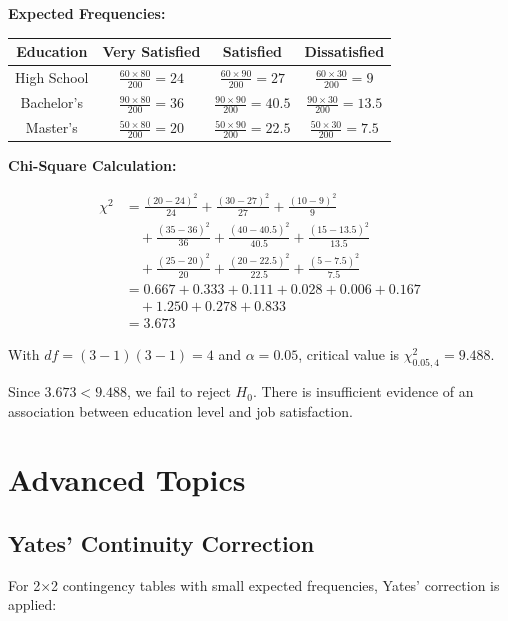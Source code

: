 \documentclass[twoside]{book}
\begin{document}
\textbf{Expected Frequencies:}

\begin{center}
\begin{tabular}{|c|c|c|c|}
\hline
Education & Very Satisfied & Satisfied & Dissatisfied \\
\hline
High School & $\frac{60 \times 80}{200} = 24$ & $\frac{60 \times 90}{200} = 27$ & $\frac{60 \times 30}{200} = 9$ \\
Bachelor's & $\frac{90 \times 80}{200} = 36$ & $\frac{90 \times 90}{200} = 40.5$ & $\frac{90 \times 30}{200} = 13.5$ \\
Master's & $\frac{50 \times 80}{200} = 20$ & $\frac{50 \times 90}{200} = 22.5$ & $\frac{50 \times 30}{200} = 7.5$ \\
\hline
\end{tabular}
\end{center}

\textbf{Chi-Square Calculation:}

\begin{align}
\chi^2 &= \frac{(20-24)^2}{24} + \frac{(30-27)^2}{27} + \frac{(10-9)^2}{9} \\
&\quad + \frac{(35-36)^2}{36} + \frac{(40-40.5)^2}{40.5} + \frac{(15-13.5)^2}{13.5} \\
&\quad + \frac{(25-20)^2}{20} + \frac{(20-22.5)^2}{22.5} + \frac{(5-7.5)^2}{7.5} \\
&= 0.667 + 0.333 + 0.111 + 0.028 + 0.006 + 0.167 \\
&\quad + 1.250 + 0.278 + 0.833 \\
&= 3.673
\end{align}

With $df = (3-1)(3-1) = 4$ and $\alpha = 0.05$, critical value is $\chi^2_{0.05,4} = 9.488$.

Since $3.673 < 9.488$, we fail to reject $H_0$. There is insufficient evidence of an association between education level and job satisfaction.

\section{Advanced Topics}

\subsection{Yates' Continuity Correction}

For 2×2 contingency tables with small expected frequencies, Yates' correction is applied:
\end{document}
